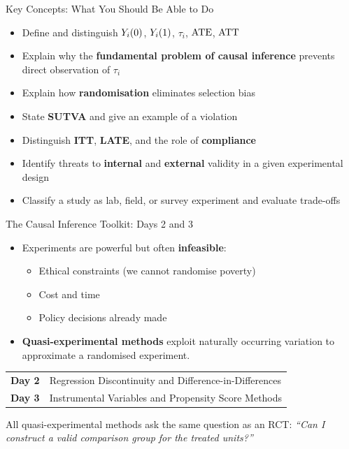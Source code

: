 \documentclass[aspectratio=169, 11pt]{beamer}
\begin{document}

\begin{frame}[t]{Key Concepts: What You Should Be Able to Do}
\begin{itemize}
  \setlength\itemsep{0.45em}
  \item Define and distinguish $Y_{i}(0)$, $Y_{i}(1)$, $\tau_i$, $\mathrm{ATE}$, $\mathrm{ATT}$
  \item Explain why the \textbf{fundamental problem of causal inference} prevents
        direct observation of $\tau_i$
  \item Explain how \textbf{randomisation} eliminates selection bias
  \item State \textbf{SUTVA} and give an example of a violation
  \item Distinguish \textbf{ITT}, \textbf{LATE}, and the role of \textbf{compliance}
  \item Identify threats to \textbf{internal} and \textbf{external} validity
        in a given experimental design
  \item Classify a study as lab, field, or survey experiment and evaluate trade-offs
\end{itemize}
\end{frame}

\begin{frame}[t]{The Causal Inference Toolkit: Days 2 and 3}
\vspace{0.5em}
\begin{itemize}
  \setlength\itemsep{0.5em}
  \item Experiments are powerful but often \textbf{infeasible}:
    \begin{itemize}
      \item Ethical constraints (we cannot randomise poverty)
      \item Cost and time
      \item Policy decisions already made
    \end{itemize}
  \item \textbf{Quasi-experimental methods} exploit naturally occurring variation
        to approximate a randomised experiment.
\end{itemize}
\vspace{0.4em}
\begin{center}
\small
\begin{tabular}{ll}
\toprule
\textbf{Day 2} & Regression Discontinuity and Difference-in-Differences \\
\textbf{Day 3} & Instrumental Variables and Propensity Score Methods \\
\bottomrule
\end{tabular}
\end{center}
\vspace{0.4em}
\begin{intuitionbox}
All quasi-experimental methods ask the same question as an RCT:
\emph{``Can I construct a valid comparison group for the treated units?''}
\end{intuitionbox}
\end{frame}
\end{document}
